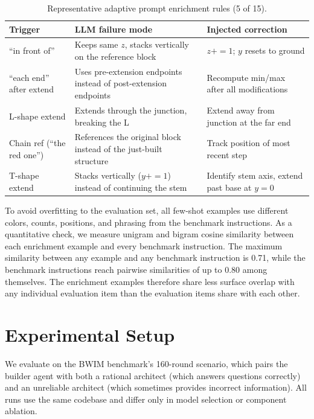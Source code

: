 \documentclass{article}
\begin{document}
\begin{table}[ht]
\centering
\small
\begin{tabular}{@{}p{1.8cm}p{3.2cm}p{3.2cm}@{}}
\toprule
\textbf{Trigger} & \textbf{LLM failure mode} & \textbf{Injected correction} \\
\midrule
``in front of'' & Keeps same $z$, stacks vertically on the reference block & $z \mathbin{+}= 1$; $y$ resets to ground \\
``each end'' after extend & Uses pre-extension endpoints instead of post-extension endpoints & Recompute min/max after all modifications \\
L-shape extend & Extends through the junction, breaking the L & Extend away from junction at the far end \\
Chain ref (``the red one'') & References the original block instead of the just-built structure & Track position of most recent step \\
T-shape extend & Stacks vertically ($y\mathbin{+}=1$) instead of continuing the stem & Identify stem axis, extend past base at $y\mathbin{=}0$ \\
\bottomrule
\end{tabular}
\caption{Representative adaptive prompt enrichment rules (5 of 15).}
\label{tab:enrichment}
\end{table}

To avoid overfitting to the evaluation set, all few-shot examples use
different colors, counts, positions, and phrasing from the benchmark
instructions. As a quantitative check, we measure unigram and bigram cosine
similarity between each enrichment example and every benchmark instruction.
The maximum similarity between any example and any benchmark instruction is
0.71, while the benchmark instructions reach pairwise similarities of up to
0.80 among themselves. The enrichment examples therefore share less surface
overlap with any individual evaluation item than the evaluation items share
with each other.

\section{Experimental Setup}

We evaluate on the BWIM benchmark's 160-round scenario, which pairs the
builder agent with both a rational architect (which answers questions
correctly) and an unreliable architect (which sometimes provides incorrect
information). All runs use the same codebase and differ only in model
selection or component ablation.
\end{document}
